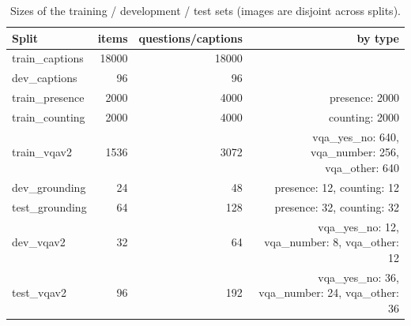 \begin{table}[t]
\centering\small
\begin{tabular}{lrrr}
\toprule
Split & items & questions/captions & by type \\
\midrule
train\_captions & 18000 & 18000 &  \\
dev\_captions & 96 & 96 &  \\
train\_presence & 2000 & 4000 & presence: 2000 \\
train\_counting & 2000 & 4000 & counting: 2000 \\
train\_vqav2 & 1536 & 3072 & vqa\_yes\_no: 640, vqa\_number: 256, vqa\_other: 640 \\
dev\_grounding & 24 & 48 & presence: 12, counting: 12 \\
test\_grounding & 64 & 128 & presence: 32, counting: 32 \\
dev\_vqav2 & 32 & 64 & vqa\_yes\_no: 12, vqa\_number: 8, vqa\_other: 12 \\
test\_vqav2 & 96 & 192 & vqa\_yes\_no: 36, vqa\_number: 24, vqa\_other: 36 \\
\bottomrule
\end{tabular}
\caption{Sizes of the training / development / test sets (images are disjoint across splits).}
\label{tab:task2_data}
\end{table}
